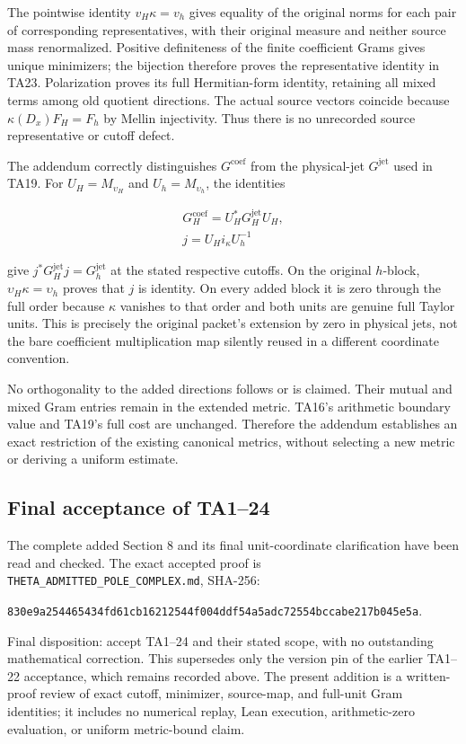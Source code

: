 The pointwise identity \(v_H\kappa=v_h\) gives equality of the original
norms for each pair of corresponding representatives, with their
original measure and neither source mass renormalized. Positive
definiteness of the finite coefficient Grams gives unique minimizers;
the bijection therefore proves the representative identity in TA23.
Polarization proves its full Hermitian-form identity, retaining all
mixed terms among old quotient directions. The actual source vectors
coincide because \(\kappa(D_x)F_H=F_h\) by Mellin injectivity. Thus there
is no unrecorded source representative or cutoff defect.


The addendum correctly distinguishes \(G^{\mathrm{coef}}\) from the physical-jet \(G^{\mathrm{jet}}\)
used in TA19. For \(U_H=M_{\upsilon_H}\) and \(U_h=M_{\upsilon_h}\), the identities


\[
\begin{gathered}
G_H^{\mathrm{coef}}=U_H^*G_H^{\mathrm{jet}}U_H, \\
j=U_Hi_\kappa U_h^{-1}
\end{gathered}
\]


give \(j^*G_H^{\mathrm{jet}}j=G_h^{\mathrm{jet}}\) at the stated respective cutoffs.
On the original \(h\)-block, \(\upsilon_H\kappa=\upsilon_h\) proves that \(j\)
is identity. On every added block it is zero through the full order
because \(\kappa\) vanishes to that order and both units are genuine full
Taylor units. This is precisely the original packet's extension by
zero in physical jets, not the bare coefficient multiplication map
silently reused in a different coordinate convention.


No orthogonality to the added directions follows or is claimed. Their
mutual and mixed Gram entries remain in the extended metric. TA16's
arithmetic boundary value and TA19's full cost are unchanged. Therefore
the addendum establishes an exact restriction of the existing canonical
metrics, without selecting a new metric or deriving a uniform estimate.


\subsection*{Final acceptance of TA1--24}


The complete added Section 8 and its final unit-coordinate clarification
have been read and checked. The exact accepted proof is
\texttt{THETA\_\allowbreak{}ADMITTED\_\allowbreak{}POLE\_\allowbreak{}COMPLEX.md}, SHA-256:


{\small\texttt{830e9a25\allowbreak{}4465434f\allowbreak{}d61cb162\allowbreak{}12544f00\allowbreak{}4ddf54a5\allowbreak{}adc72554\allowbreak{}bccabe21\allowbreak{}7b045e5a}}.


Final disposition: accept TA1--24 and their stated scope, with no
outstanding mathematical correction. This supersedes only the version
pin of the earlier TA1--22 acceptance, which remains recorded above.
The present addition is a written-proof review of exact cutoff,
minimizer, source-map, and full-unit Gram identities; it includes no
numerical replay, Lean execution, arithmetic-zero evaluation, or
uniform metric-bound claim.
